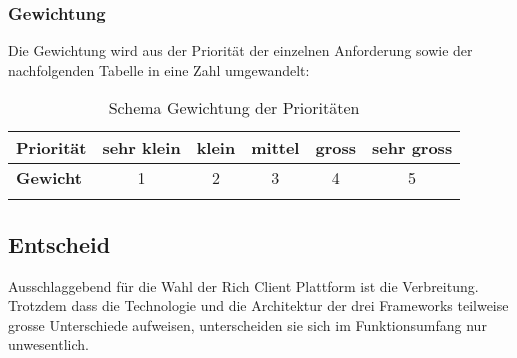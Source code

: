 \subsubsection{Gewichtung}
Die Gewichtung wird aus der Priorität der einzelnen Anforderung sowie der nachfolgenden Tabelle in eine Zahl umgewandelt:
\begin{longtable}{|l|c|c|c|c|c|}\hline
 \textbf{Priorität} & sehr klein & klein & mittel & gross & sehr gross\\\hline
 \textbf{Gewicht} & 1 & 2 & 3 & 4 & 5\\\hline
 \caption{Schema Gewichtung der Prioritäten}
\end{longtable}


\subsection{Entscheid}\label{rcp_entscheid}
Ausschlaggebend für die Wahl der Rich Client Plattform ist die Verbreitung. Trotzdem dass die Technologie und die Architektur der drei Frameworks teilweise grosse Unterschiede aufweisen, unterscheiden sie sich im Funktionsumfang nur unwesentlich. 

